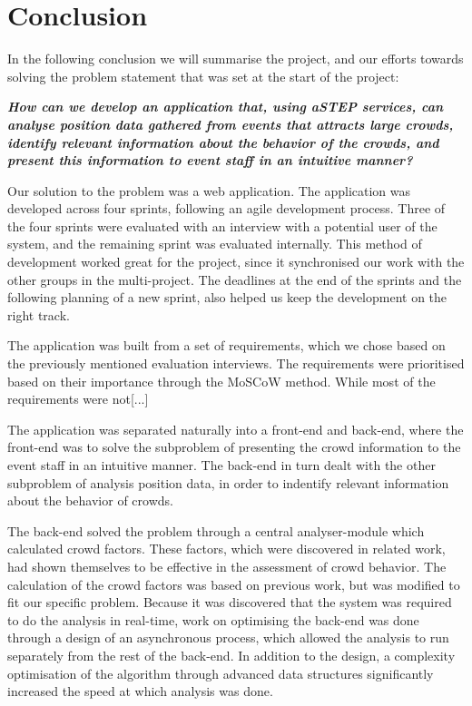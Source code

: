 \chapter{Conclusion}\label{ch:conclusion}


In the following conclusion we will summarise the project, and our efforts towards solving the problem statement that was set at the start of the project:

\vspace{0.5 cm}
\begin{center}
	\textbf{\textit{How can we develop an application that, using aSTEP services, can analyse position data gathered from events that attracts large crowds, identify relevant information about the behavior of the crowds, and present this information to event staff in an intuitive manner?}}
\end{center}

Our solution to the problem was a web application. The application was developed across four sprints, following an agile development process. Three of the four sprints were evaluated with an interview with a potential user of the system, and the remaining sprint was evaluated internally. This method of development worked great for the project, since it synchronised our work with the other groups in the multi-project. The deadlines at the end of the sprints and the following planning of a new sprint, also helped us keep the development on the right track.

The application was built from a set of requirements, which we chose based on the previously mentioned evaluation interviews. The requirements were prioritised based on their importance through the MoSCoW method. While most of the requirements were not[...] 

The application was separated naturally into a front-end and back-end, where the front-end was to solve the subproblem of presenting the crowd information to the event staff in an intuitive manner. The back-end in turn dealt with the other subproblem of analysis position data, in order to indentify relevant information about the behavior of crowds.

The back-end solved the problem through a central analyser-module which calculated crowd factors. These factors, which were discovered in related work, had shown themselves to be effective in the assessment of crowd behavior. The calculation of the crowd factors was based on previous work, but was modified to fit our specific problem. Because it was discovered that the system was required to do the analysis in real-time, work on optimising the back-end was done through a design of an asynchronous process, which allowed the analysis to run separately from the rest of the back-end. In addition to the design, a complexity optimisation of the algorithm through advanced data structures significantly increased the speed at which analysis was done.

